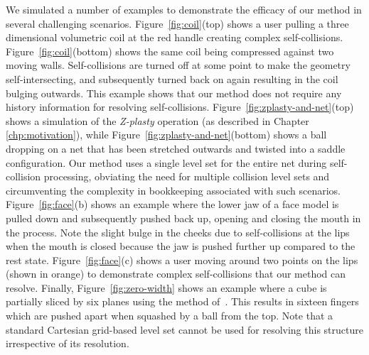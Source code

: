 We simulated a number of examples to demonstrate the efficacy of our
method in several challenging scenarios.
%
Figure~\ref{fig:coil}(top) shows a user pulling a three dimensional
volumetric coil at the red handle creating complex
self-collisions. Figure~\ref{fig:coil}(bottom) shows the same coil
being compressed against two moving walls. Self-collisions are turned
off at some point to make the geometry self-intersecting, and
subsequently turned back on again resulting in the coil bulging
outwards. This example shows that our method does not require any
history information for resolving self-collisions.
%
Figure~\ref{fig:zplasty-and-net}(top) shows a simulation of the
\emph{Z-plasty} operation (as described in Chapter \ref{chp:motivation}), while
Figure~\ref{fig:zplasty-and-net}(bottom) shows a ball dropping on a
net that has been stretched outwards and twisted into a saddle
configuration. Our method uses a single level set for the entire net
during self-collision processing, obviating the need for multiple
collision level sets and circumventing the complexity in bookkeeping
associated with such scenarios.
%
Figure~\ref{fig:face}(b) shows an example where the lower jaw of a
face model is pulled down and subsequently pushed back up, opening and
closing the mouth in the process. Note the slight bulge in the cheeks
due to self-collisions at the lips when the mouth is closed because
the jaw is pushed further up compared to the rest state.
Figure~\ref{fig:face}(c) shows a user moving around two points on the
lips (shown in orange) to demonstrate complex self-collisions that our
method can resolve.
%
Finally, Figure~\ref{fig:zero-width} shows an example where a cube is
partially sliced by six planes using the method
of~\citep{SifakDF:2007}. This results in sixteen fingers which are
pushed apart when squashed by a ball from the top. Note that a
standard Cartesian grid-based level set cannot be used for resolving
this structure irrespective of its resolution.



\renewcommand{\arraystretch}{.8}
\setlength{\tabcolsep}{3pt}


